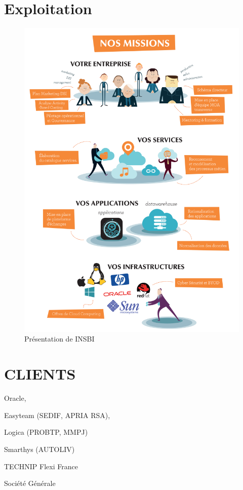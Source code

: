 \section{Exploitation}

\begin{figure}[h]
	\begin{center}
		\includegraphics[scale=0.75]{images/missions.png}
		\caption{Présentation de INSBI}
		\label{presentation}
	\end{center}
\end{figure}

\cleardoublepage
\section{CLIENTS}
   \begin{list}{•}{ }
   \item Oracle,
   \item Easyteam (SEDIF, APRIA RSA),
   \item Logica (PROBTP, MMPJ)
   \item Smarthys (AUTOLIV)
   \item TECHNIP  Flexi France
   \item Société Générale
   \end{list}

